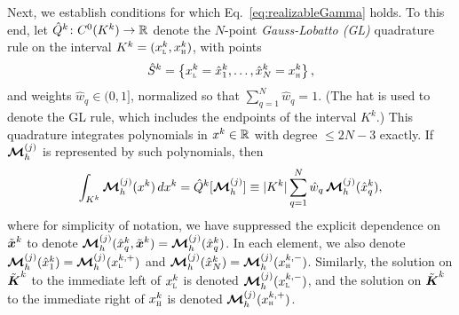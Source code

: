 Next, we establish conditions for which Eq.~\eqref{eq:realizableGamma} holds.  
To this end, let $\hat{Q}^{k}\colon C^{0}(K^{k})\to\mathbb{R}$ denote the $N$-point \emph{Gauss-Lobatto (GL)} quadrature rule on the interval $K^{k}=(x_{\textnormal{\tiny\textsc{L}}}^{k},x_{\textnormal{\tiny\textsc{H}}}^{k})$, with points
\begin{equation}
  \hat{S}^{k}=\left\{x_{\textnormal{\tiny\textsc{L}}}^{k}=\hat{x}_{1}^{k},\ldots,\hat{x}_{N}^{k}=x_{\textnormal{\tiny\textsc{H}}}^{k}\right\}, 
  \label{eq:quadraturePointsGL}
\end{equation}
and weights $\hat{w}_{q} \in (0,1]$, normalized so that $\sum_{q=1}^{N} \hat{w}_{q} = 1$.  
(The hat is used to denote the GL rule, which includes the endpoints of the interval $K^{k}$.)
This quadrature integrates polynomials in $x^{k} \in \mathbb{R}$ with degree $\le2N-3$ exactly.  
If $\boldsymbol{\mathcal{M}}_{h}^{(j)}$ is represented by such polynomials, then
\begin{equation}
  \int_{K^{k}} \boldsymbol{\mathcal{M}}_{h}^{(j)}(x^{k})\,dx^{k} = \hat{Q}^{k}[\boldsymbol{\mathcal{M}}_{h}^{(j)}] \equiv
  |K^{k}| \sum_{q=1}^{N} \hat{w}_{q}\,\boldsymbol{\mathcal{M}}_{h}^{(j)}(\hat{x}_{q}^{k}),
  \label{eq:quadratureRuleGL}
\end{equation}
where for simplicity of notation, we have suppressed the explicit dependence on $\tilde{\boldsymbol{x}}^{k}$ to denote $\boldsymbol{\mathcal{M}}_{h}^{(j)}(\hat{x}_q^{k},\tilde{\boldsymbol{x}}^{k}) = \boldsymbol{\mathcal{M}}_{h}^{(j)}(\hat{x}_{q}^{k})$.  
In each element, we also denote $\boldsymbol{\mathcal{M}}_{h}^{(j)}(\hat{x}_{1}^{k})=\boldsymbol{\mathcal{M}}_{h}^{(j)}(x_{\textnormal{\tiny\textsc{L}}}^{k,+})$ and $\boldsymbol{\mathcal{M}}_{h}^{(j)}(\hat{x}_{N}^{k})=\boldsymbol{\mathcal{M}}_{h}^{(j)}(x_{\textnormal{\tiny\textsc{H}}}^{k,-})$.  
Similarly, the solution on $\tilde{\boldsymbol{\boldsymbol{K}}}^{k}$ to the immediate left of $x_{\textnormal{\tiny\textsc{L}}}^{k}$ is denoted $\boldsymbol{\mathcal{M}}_{h}^{(j)}(x_{\textnormal{\tiny\textsc{L}}}^{k,-})$, and the solution on $\tilde{\boldsymbol{\boldsymbol{K}}}^{k}$ to the immediate right of $x_{\textnormal{\tiny\textsc{H}}}^{k}$ is denoted $\boldsymbol{\mathcal{M}}_{h}^{(j)}(x_{\textnormal{\tiny\textsc{H}}}^{k,+})$.  

